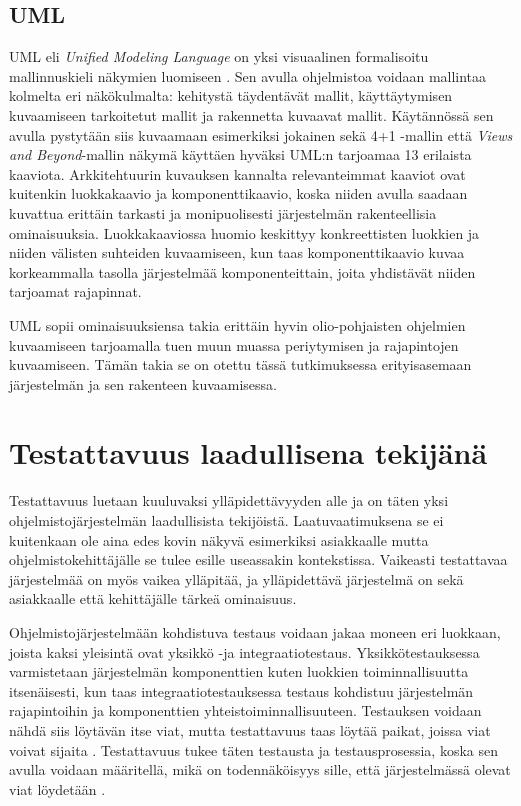 \documentclass[finnish]{tktltiki2}
\numberwithin{table}{section}
\theoremstyle{definition}
\theoremstyle{remark}
\begin{document}
\subsection{UML}

UML eli \textit{Unified Modeling Language} on yksi visuaalinen formalisoitu mallinnuskieli näkymien luomiseen \citep{UML}. Sen avulla ohjelmistoa voidaan mallintaa kolmelta eri näkökulmalta: kehitystä täydentävät mallit, käyttäytymisen kuvaamiseen tarkoitetut mallit ja rakennetta kuvaavat mallit. Käytännössä sen avulla pystytään siis kuvaamaan esimerkiksi jokainen sekä 4+1 -mallin että \textit{Views and Beyond}-mallin näkymä käyttäen hyväksi UML:n tarjoamaa 13 erilaista kaaviota. Arkkitehtuurin kuvauksen kannalta relevanteimmat kaaviot ovat kuitenkin luokkakaavio ja komponenttikaavio, koska niiden avulla saadaan kuvattua erittäin tarkasti ja monipuolisesti järjestelmän rakenteellisia ominaisuuksia. Luokkakaaviossa huomio keskittyy konkreettisten luokkien ja niiden välisten suhteiden kuvaamiseen, kun taas komponenttikaavio kuvaa korkeammalla tasolla järjestelmää komponenteittain, joita yhdistävät niiden tarjoamat rajapinnat.   

UML sopii ominaisuuksiensa takia erittäin hyvin olio-pohjaisten ohjelmien kuvaamiseen tarjoamalla tuen muun muassa periytymisen ja rajapintojen kuvaamiseen. Tämän takia se on otettu tässä tutkimuksessa erityisasemaan järjestelmän ja sen rakenteen kuvaamisessa.


\section{Testattavuus laadullisena tekijänä} \label{testability_main}
Testattavuus luetaan kuuluvaksi ylläpidettävyyden alle \citep{ISO/IEC25010:2011} ja on täten yksi ohjelmistojärjestelmän laadullisista tekijöistä. Laatuvaatimuksena se ei kuitenkaan ole aina edes kovin näkyvä esimerkiksi asiakkaalle mutta ohjelmistokehittäjälle se tulee esille useassakin kontekstissa. Vaikeasti testattavaa järjestelmää on myös vaikea ylläpitää, ja ylläpidettävä järjestelmä on sekä asiakkaalle että kehittäjälle tärkeä ominaisuus.

Ohjelmistojärjestelmään kohdistuva testaus voidaan jakaa moneen eri luokkaan, joista kaksi yleisintä ovat yksikkö -ja integraatiotestaus. Yksikkötestauksessa varmistetaan järjestelmän komponenttien kuten luokkien toiminnallisuutta itsenäisesti, kun taas integraatiotestauksessa testaus kohdistuu järjestelmän rajapintoihin ja komponenttien yhteistoiminnallisuuteen. Testauksen voidaan nähdä siis löytävän itse viat, mutta testattavuus taas löytää paikat, joissa viat voivat sijaita \citep[s. 19]{Voas:1995:STN:624607.625469}. Testattavuus tukee täten testausta ja testausprosessia, koska sen avulla voidaan määritellä, mikä on todennäköisyys sille, että järjestelmässä olevat viat löydetään \citep{voas_improving_1992}. 
\end{document}
